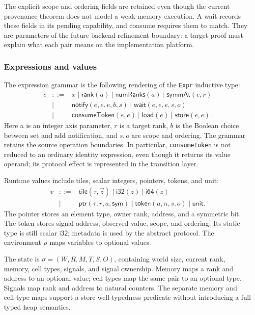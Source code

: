 \documentclass[a4paper,USenglish]{lipics-v2021}
\begin{document}
The explicit scope and ordering fields are retained even though the current
provenance theorem does not model a weak-memory execution. A wait records
these fields in its pending capability, and consume requires them to match.
They are parameters of the future backend-refinement boundary: a target proof
must explain what each pair means on the implementation platform.

\subsubsection{Expressions and values}
The expression grammar is the following rendering of the \texttt{Expr}
inductive type:
\[
\begin{array}{rcl}
 e & ::= & x \mid \mathsf{rank}(a) \mid \mathsf{numRanks}(a)
     \mid \mathsf{symmAt}(e,r) \\[1mm]
   &\mid& \mathsf{notify}(e,e,e,b,s)
     \mid \mathsf{wait}(e,e,e,s,o) \\[1mm]
   &\mid& \mathsf{consumeToken}(e,e)
     \mid \mathsf{load}(e) \mid \mathsf{store}(e,e).
\end{array}
\]
Here \(a\) is an integer axis parameter, \(r\) is a target rank, \(b\) is
the Boolean choice between set and add notification, and \(s,o\) are scope
and ordering. The grammar retains the source operation boundaries. In
particular, \texttt{consumeToken} is not reduced to an ordinary identity
expression, even though it returns its value operand; its protocol effect is
represented in the transition layer.

Runtime values include tiles, scalar integers, pointers, tokens, and unit:
\[
\begin{array}{rcl}
 v & ::= & \mathsf{tile}(\tau,\vec z) \mid \mathsf{i32}(z)
     \mid \mathsf{i64}(z) \\[1mm]
   &\mid& \mathsf{ptr}(\tau,r,a,\mathsf{sym})
     \mid \mathsf{token}(a,n,s,o) \mid \mathsf{unit}.
\end{array}
\]
The pointer stores an element type, owner rank, address, and a symmetric bit.
The token stores signal address, observed value, scope, and ordering. Its
static type is still scalar \(\mathsf{i32}\); metadata is used by the abstract
protocol. The environment \(\rho\) maps variables to optional values.

The state is \(\sigma=(W,R,M,T,S,O)\), containing world size, current rank,
memory, cell types, signals, and signal ownership. Memory maps a rank and
address to an optional value; cell types map the same pair to an optional type.
Signals map rank and address to natural counters. The separate memory and
cell-type maps support a store well-typedness predicate without introducing a
full typed heap semantics.
\end{document}
